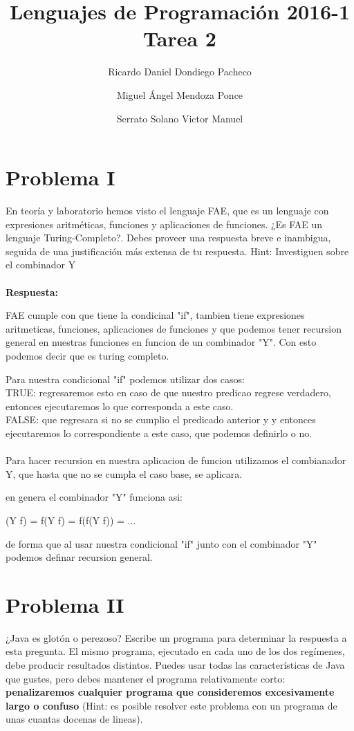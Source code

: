 \documentclass[12pt]{article}
\title{Lenguajes de Programación 2016-1\\Tarea 2}
\author{Ricardo Daniel Dondiego Pacheco \and  Miguel Ángel Mendoza Ponce \and Serrato Solano Victor Manuel}
\begin{document}
\maketitle
\section*{Problema I}
En teoría y laboratorio hemos visto el lenguaje FAE, que es un lenguaje
con expresiones aritméticas, funciones y aplicaciones de funciones.
¿Es FAE un lenguaje Turing-Completo?. Debes proveer una respuesta breve e inambigua, seguida de una justificación más extensa de tu respuesta.
Hint: Investiguen sobre el combinador Y\\\\
\textbf{Respuesta: }

FAE cumple con que tiene la condicinal "if", tambien tiene expresiones aritmeticas, funciones, aplicaciones de funciones y que podemos tener recursion general en nuestras funciones en funcion de un combinador "Y". Con esto podemos decir que es turing completo.

Para nuestra condicional "if" podemos utilizar dos casos:\\
TRUE: regresaremos esto en caso de que nuestro predicao regrese verdadero, entonces ejecutaremos lo que corresponda a este caso.\\
FALSE: que regresara si no se cumplio el predicado anterior y y entonces ejecutaremos lo correspondiente a este caso, que podemos definirlo o no.\\\\

Para hacer recursion en nuestra aplicacion de funcion utilizamos el combianador Y, que hasta que no se cumpla el caso base, se aplicara.

en genera el combinador "Y" funciona asi:

(Y f) = f(Y f) = f(f(Y f)) = ...

de forma que al usar nuestra condicional "if" junto con el combinador "Y" podemos definar recursion general.



\section*{Problema II}
¿Java es glotón o perezoso? Escribe un programa para determinar la respuesta a esta
pregunta. El mismo programa, ejecutado en cada uno de los dos regímenes, debe
producir resultados distintos. Puedes usar todas las características de Java
que gustes, pero debes mantener el programa relativamente corto:
\textbf{penalizaremos cualquier programa que consideremos excesivamente
  largo o confuso } (Hint: es posible resolver este problema con un programa
de unas cuantas docenas de lineas).
\\
\end{document}
